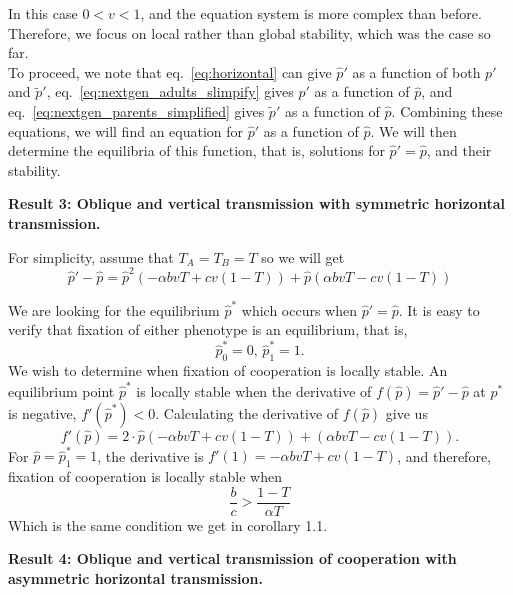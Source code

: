 \documentclass[12pt]{extarticle}
\begin{document}
In this case $0<v<1$, and the equation system is more complex than before.
Therefore, we focus on local rather than global stability, which was the case so far.\\
To proceed, we note that 
eq.~\ref{eq:horizontal} can give $\hat{p}'$ as a function of both $p'$ and $\tilde{p}'$,
eq.~\ref{eq:nextgen_adults_slimpify} gives $p'$ as a function of $\hat{p}$, and 
eq.~\ref{eq:nextgen_parents_simplified} gives $\tilde{p}'$ as a function of $\hat{p}$. 
Combining these equations, we will find an equation for $\hat{p}'$ as a function of $\hat{p}$.
We will then determine the equilibria of this function, that is, solutions for $\hat{p}' = \hat{p}$, and their stability.

\textbf{Result 3: Oblique and vertical transmission with symmetric horizontal transmission.}

For simplicity, assume that $T_A = T_B = T$ so we will get
\begin{equation} \label{eq:equal_horizontal_transmission}
  \hat{p}' - \hat{p} =  \hat{p} ^2(-\alpha bvT + cv(1-T)) + \hat{p} (\alpha bvT -cv(1-T))
\end{equation}

We are looking for the equilibrium $\hat{p}^*$ which occurs when $\hat{p}' = \hat{p}$.
It is easy to verify that fixation of either phenotype is an equilibrium, that is,
\begin{equation} \label{eq:result2.1}
  \hat{p}^*_0 =  0, \, \hat{p}^*_1 = 1 .
\end{equation}
We wish to determine when fixation of cooperation is locally stable. 
An equilibrium point $\hat{p}^*$ is locally stable when the derivative of $f(\hat{p}) = \hat{p}'-\hat{p}$ at $p^*$ is negative, $f'(\hat{p}^*)<0$. 
Calculating the derivative of $f(\hat{p})$ give us 
\begin{equation} \label{eq:derivative_of_phattag-phat}
 f'(\hat{p}) = 2\cdot\hat{p} (-\alpha bvT + cv(1-T)) + (\alpha bvT -cv(1-T)).
\end{equation}
For $\hat{p} = \hat{p}^*_1=1$, the derivative is
$f'(1) = -\alpha bvT + cv(1-T)$, and therefore, fixation of cooperation is locally stable when
\begin{equation} \label{eq:oblique_and_vertic_result2}
  \frac{b}{c}>\frac{1-T}{\alpha T}
\end{equation}
Which is the same condition we get in corollary 1.1.

\textbf{Result 4: Oblique and vertical transmission of cooperation with asymmetric horizontal transmission.}
\end{document}

